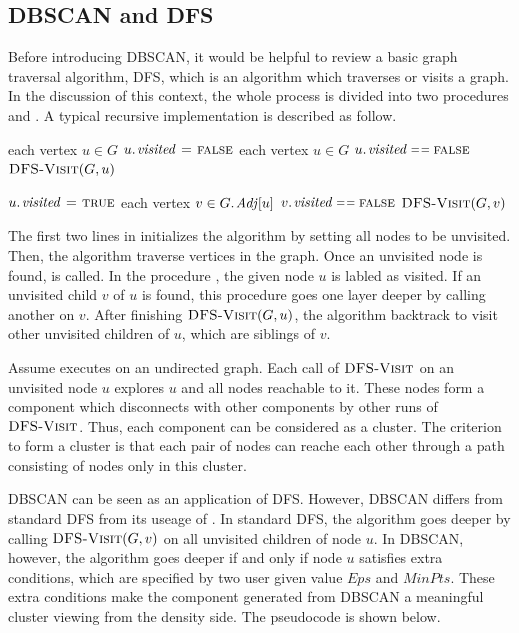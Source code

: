 \subsection{DBSCAN and DFS}
\label{subsec:DBSCANDFS}
Before introducing DBSCAN, it would be helpful to review a basic graph traversal algorithm, DFS, which is an algorithm which traverses or visits a graph. In the discussion of this context, the whole process is divided into two procedures  and . A typical recursive implementation is described as follow. 

\begin{codebox}
\li \For each vertex $u \in G$
\li		\Do
			$\attrib{u}{visited} \gets \const{false}$
	\End
\li	\For each vertex $u \in G$
\li		\Do
		\If \(\attrib{u}{visited} \isequal \const{false}\)
\li			\Then
				$\textnormal{\scshape DFS-Visit}(G, u)$
		\End
	\End
\end{codebox}

\begin{codebox}
\li	$\attrib{u}{visited} \gets \const{true}$
\li	\For each vertex $v \in \attrib{G}{Adj}[u]$
\li	\Do
		\If	$\attrib{v}{visited} \isequal \const{false} $
\li			\Then
				$\textnormal{\scshape DFS-Visit}(G, v)$
		\End
	\End
\end{codebox}

The first two lines in  initializes the algorithm by setting all nodes to be unvisited. Then, the algorithm traverse vertices in the graph. Once an unvisited node is found,  is called. In the procedure , the given node $u$ is labled as visited. If an unvisited child $v$ of $u$ is found, this procedure goes one layer deeper by calling another  on $v$. After finishing $\textnormal{\scshape DFS-Visit}(G, u)$, the algorithm backtrack to visit other unvisited children of $u$, which are siblings of $v$.

Assume  executes on an undirected graph. Each call of $\textnormal{\scshape DFS-Visit}$ on an unvisited node $u$ explores $u$ and all nodes reachable to it. These nodes form a component which disconnects with other components by other runs of $\textnormal{\scshape DFS-Visit}$. Thus, each component can be considered as a cluster. The criterion to form a cluster is that each pair of nodes can reache each other through a path consisting of nodes only in this cluster.

DBSCAN can be seen as an application of DFS. However, DBSCAN differs from standard DFS from its useage of . In standard DFS, the algorithm goes deeper by calling $\textnormal{\scshape DFS-Visit}(G, v)$ on all unvisited children of node $u$. In DBSCAN, however, the algorithm goes deeper if and only if node $u$ satisfies extra conditions, which are specified by two user given value $Eps$ and $MinPts$. These extra conditions make the component generated from DBSCAN a meaningful cluster viewing from the density side. The pseudocode is shown below.

